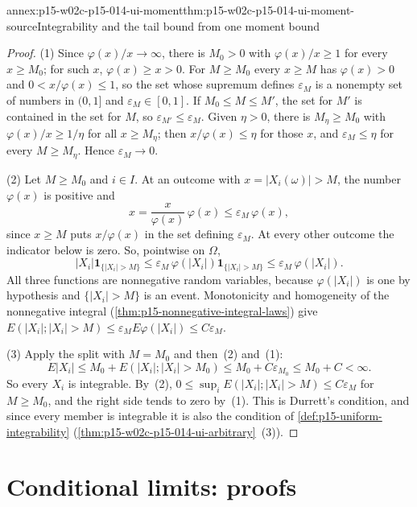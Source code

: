 \begin{annexitem}{annex:p15-w02c-p15-014-ui-moment}{thm:p15-w02c-p15-014-ui-moment-source}{Integrability and the tail bound from one moment bound}
\begin{proof}
(1) Since \(\varphi(x)/x\to\infty\), there is \(M_0>0\) with
\(\varphi(x)/x\geq1\) for every \(x\geq M_0\); for such \(x\),
\(\varphi(x)\geq x>0\). For \(M\geq M_0\) every \(x\geq M\) has
\(\varphi(x)>0\) and \(0<x/\varphi(x)\leq1\), so the set whose supremum
defines \(\varepsilon_M\) is a nonempty set of numbers in \((0,1]\) and
\(\varepsilon_M\in[0,1]\). If \(M_0\leq M\leq M'\), the set for \(M'\) is
contained in the set for \(M\), so \(\varepsilon_{M'}\leq\varepsilon_M\).
Given \(\eta>0\), there is \(M_\eta\geq M_0\) with
\(\varphi(x)/x\geq1/\eta\) for all \(x\geq M_\eta\); then
\(x/\varphi(x)\leq\eta\) for those \(x\), and \(\varepsilon_M\leq\eta\)
for every \(M\geq M_\eta\). Hence \(\varepsilon_M\to0\).

(2) Let \(M\geq M_0\) and \(i\in I\). At an outcome with
\(x=|X_i(\omega)|>M\), the number \(\varphi(x)\) is positive and
\[
 x=\frac{x}{\varphi(x)}\,\varphi(x)\leq\varepsilon_M\,\varphi(x),
\]
since \(x\geq M\) puts \(x/\varphi(x)\) in the set defining
\(\varepsilon_M\). At every other outcome the indicator below is zero.
So, pointwise on \(\Omega\),
\[
 |X_i|\mathbf1_{\{|X_i|>M\}}
 \leq\varepsilon_M\,\varphi(|X_i|)\mathbf1_{\{|X_i|>M\}}
 \leq\varepsilon_M\,\varphi(|X_i|).
\]
All three functions are nonnegative random variables, because
\(\varphi(|X_i|)\) is one by hypothesis and \(\{|X_i|>M\}\) is an event.
Monotonicity and homogeneity of the nonnegative integral
(\cref{thm:p15-nonnegative-integral-laws}) give
\(E(|X_i|;|X_i|>M)\leq\varepsilon_M E\varphi(|X_i|)\leq C\varepsilon_M\).

(3) Apply the split with \(M=M_0\) and then~(2) and~(1):
\[
 E|X_i|\leq M_0+E(|X_i|;|X_i|>M_0)\leq M_0+C\varepsilon_{M_0}\leq M_0+C<\infty .
\]
So every \(X_i\) is integrable. By~(2),
\(0\leq\sup_iE(|X_i|;|X_i|>M)\leq C\varepsilon_M\) for \(M\geq M_0\), and
the right side tends to zero by~(1). This is Durrett's condition, and
since every member is integrable it is also the condition of
\cref{def:p15-uniform-integrability}
(\cref{thm:p15-w02c-p15-014-ui-arbitrary}~(3)).
\end{proof}
\end{annexitem}

\section{Conditional limits: proofs}
\label{sec:annex-p15-w02c-p15-014-conditional}

